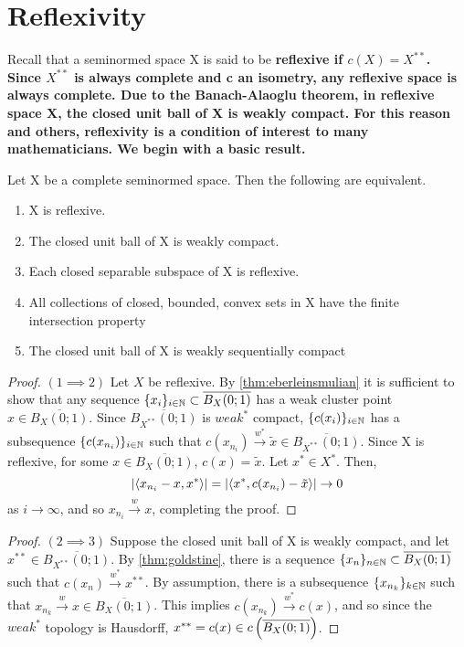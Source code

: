 
\section{Reflexivity}
Recall that a seminormed space X is said to be \bf reflexive \rm if $c(X)=X^{**}$. Since $X^{**}$ is always complete and c an isometry, any reflexive space is always complete.
Due to the Banach-Alaoglu theorem, in reflexive space X, the closed unit ball of X is weakly compact. For this reason and others, reflexivity is a condition of interest to many mathematicians. We begin with a basic result. 

\begin{lem}
    \label{lem:reflexiveseparable}
    Let X be a complete seminormed space. Then the following are equivalent. 
    \begin{enumerate}
        \item X is reflexive. 
        \item The closed unit ball of X is weakly compact. 
        \item Each closed separable subspace of X is reflexive. 
        \item All collections of closed, bounded, convex sets in X have the finite intersection property
        \item The closed unit ball of X is weakly sequentially compact
    \end{enumerate} 
    \begin{proof}$(1 \implies 2)$
        Let $X$ be reflexive. By \ref{thm:eberleinsmulian} it is sufficient to show that any sequence $\{x_i\}_{i \in \mathbb{N}} \subset \overline{B_X(0;1)}$ has a weak cluster point $x \in \overline{B_X(0;1)}$. Since $\overline{B_{X^{**}}(0;1)}$ is $weak^*$ compact, $\{c(x_i)\}_{i \in \mathbb{N}}$ has a subsequence $\{c(x_{n_i})\}_{i \in \mathbb{N}}$ such that $c(x_{n_i}) \overset{w^*}{\to} \tilde{x} \in \overline{B_{X^{**}}(0;1)}$. Since X is reflexive, for some $x \in \overline{B_X(0;1)}$, $c(x)= \tilde{x}$. 
        Let $x^* \in X^*$. Then, \begin{equation}
            \left| \left\langle x_{n_i}-x,x^* \right\rangle \right| = \left| \left\langle x^*,c(x_{n_i})-\tilde{x} \right\rangle \right| \to 0
        \end{equation}
        as $i \to \infty$, and so $x_{n_i} \overset{w}{\to} x$, completing the proof. 
    \end{proof}
    \begin{proof} $(2 \implies 3)$
        Suppose the closed unit ball of X is weakly compact, and let $x^{**} \in \overline{B_{X^{**}}(0;1)}$. By \ref{thm:goldstine}, there is a sequence $\{x_n\}_{n \in \mathbb{N}} \subset \overline{B_X(0;1)}$ such that $c(x_n) \overset{w^*}{\to}  x^{**}$. By assumption, there is a subsequence $\{x_{n_k}\}_{k \in \mathbb{N}}$ such that $x_{n_k} \overset{w}{\to} x \in \overline{B_X(0;1)}$. This implies $c(x_{n_k}) \overset{w^*}{\to} c(x)$, and so since the $weak^*$ topology is Hausdorff,  $x^{**}=c(x) \in c\left( \overline{B_X(0;1)}\right)$. 

\end{proof}
\end{lem}
